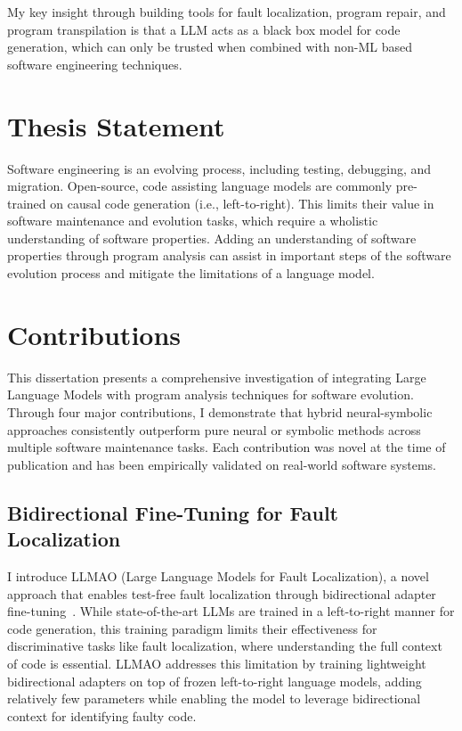 \documentclass[12pt,openany,oneside,table]{cmuthesis}
\begin{document}
My key insight through building tools for fault localization, program repair, and program transpilation is that a LLM acts as a black box model for code generation, which can only be trusted when combined with non-ML based software engineering techniques.

\section{Thesis Statement}

Software engineering is an evolving process, including testing, debugging, and migration. Open-source, code assisting language models are commonly pre-trained on causal code generation (i.e., left-to-right). This limits their value in software maintenance and evolution tasks, which require a wholistic understanding of software properties. Adding an understanding of software properties through program analysis can assist in important steps of the software evolution process and mitigate the limitations of a language model.

\section{Contributions}

This dissertation presents a comprehensive investigation of integrating Large Language Models with program analysis techniques for software evolution. Through four major contributions, I demonstrate that hybrid neural-symbolic approaches consistently outperform pure neural or symbolic methods across multiple software maintenance tasks. Each contribution was novel at the time of publication and has been empirically validated on real-world software systems.

\subsection{Bidirectional Fine-Tuning for Fault Localization}

I introduce LLMAO (Large Language Models for Fault Localization), a novel approach that enables test-free fault localization through bidirectional adapter fine-tuning~\cite{Llmao}. While state-of-the-art LLMs are trained in a left-to-right manner for code generation, this training paradigm limits their effectiveness for discriminative tasks like fault localization, where understanding the full context of code is essential. LLMAO addresses this limitation by training lightweight bidirectional adapters on top of frozen left-to-right language models, adding relatively few parameters while enabling the model to leverage bidirectional context for identifying faulty code.
\end{document}
